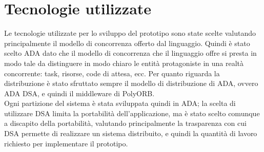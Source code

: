 \section{Tecnologie utilizzate}
Le tecnologie utilizzate per lo sviluppo del prototipo sono state scelte valutando principalmente il modello di concorrenza offerto dal linguaggio. Quindi è stato scelto ADA dato che il modello di concorrenza che il linguaggio offre si presta in modo tale da distinguere in modo chiaro le entità protagoniste in una realtà concorrente: task, risorse, code di attesa, ecc. Per quanto riguarda la distribuzione è stato sfruttato sempre il modello di distribuzione di ADA, ovvero ADA DSA, e quindi il middleware di PolyORB. \\
Ogni partizione del sistema è stata sviluppata quindi in ADA; la scelta di utilizzare DSA limita la portabilità dell'applicazione, ma è stato scelto comunque a discapito della portabilità, valutando principalmente la trasparenza con cui DSA permette di realizzare un sistema distribuito, e quindi la quantità di lavoro richiesto per implementare il prototipo.